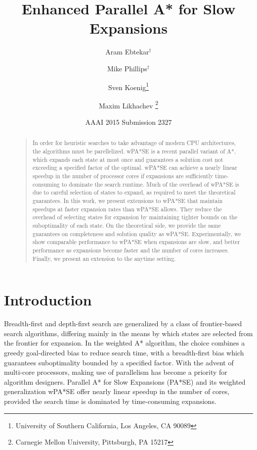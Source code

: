 \documentclass[letterpaper]{article}
\begin{document}
%
\title{Enhanced Parallel A* for Slow Expansions}
\author{Aram Ebtekar$^\dagger$ \and Mike Phillips$^\dagger$ \and Sven Koenig\thanks{University of Southern California, Los Angeles, CA 90089} \and Maxim Likhachev%
\thanks{Carnegie Mellon University, Pittsburgh, PA 15217}%
%
}
\author{AAAI 2015 Submission 2327}%
\maketitle
\begin{abstract}
\begin{quote}
In order for heuristic searches to take advantage of modern CPU architectures, the algorithms must be parellelized.
wPA*SE is a recent parallel variant of A*, which expands each state at most once and guarantees a solution cost not exceeding a specified factor of the optimal.
wPA*SE can achieve a nearly linear speedup in the number of processor cores if expansions are sufficiently time-consuming to dominate the search runtime.
Much of the overhead of wPA*SE is due to careful selection of states to expand, as required to meet the theoretical guarantees.
In this work, we present extensions to wPA*SE that maintain speedups at faster expansion rates than wPA*SE allows.
They reduce the overhead of selecting states for expansion by maintaining tighter bounds on the suboptimality of each state.
On the theoretical side, we provide the same guarantees on completeness and solution quality as wPA*SE.
Experimentally, we show comparable performance to wPA*SE when expansions are slow, and better performance as expansions become faster and the number of cores increases.
Finally, we present an extension to the anytime setting.
\end{quote}
\end{abstract}

\section{Introduction}

Breadth-first and depth-first search are generalized by a class of frontier-based search algorithms, differing mainly in the means by which states are selected from the frontier for expansion. In the weighted A* algorithm, the choice combines a greedy goal-directed bias to reduce search time, with a breadth-first bias which guarantees suboptimality bounded by a specified factor. With the advent of multi-core processors, making use of parallelism has become a priority for algorithm designers. Parallel A* for Slow Expansions (PA*SE) and its weighted generalization wPA*SE offer nearly linear speedup in the number of cores, provided the search time is dominated by time-consuming expansions.
\end{document}
